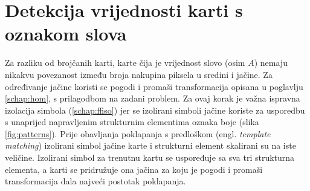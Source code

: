 \documentclass[times, zavrsni, numeric, utf8]{fer}
\begin{document}
\section{Detekcija vrijednosti karti s oznakom slova} %
\label{schap:detroyal}
\hspace*{0.5cm}Za razliku od brojčanih karti, karte čija je vrijednost slovo (osim $A$) nemaju nikakvu povezanost između broja nakupina piksela u sredini i jačine. Za određivanje jačine koristi se pogodi i promaši transformacija opisana u poglavlju \ref{schap:hom}, s prilagodbom na zadani problem. Za ovaj korak je važna ispravna izolacija simbola (\ref{schap:ffiso}) jer se izolirani simboli jačine koriste za usporedbu s unaprijed napravljenim strukturnim elementima oznaka boje (slika \ref{fig:patterns}). Prije obavljanja poklapanja s predloškom (engl. \textit{template matching}) izolirani simbol jačine karte i strukturni element skalirani su na iste veličine. Izolirani simbol za trenutnu kartu se uspoređuje sa sva tri strukturna elementa, a karti se pridružuje ona jačina za koju je pogodi i promaši transformacija dala najveći postotak poklapanja. 
\end{document}
